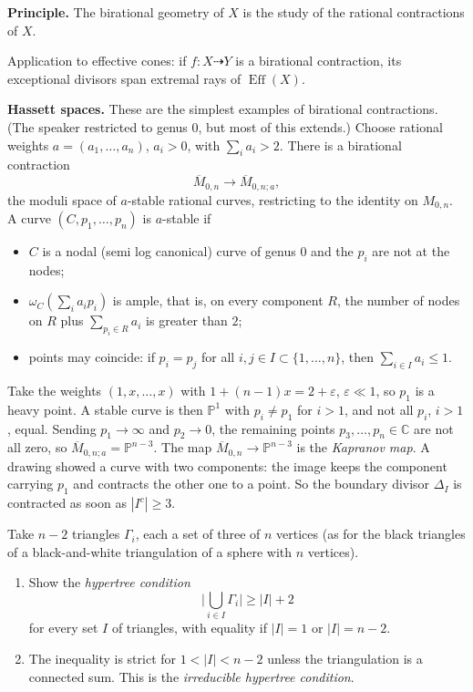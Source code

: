 \medskip\noindent
{\bf Principle.} The birational geometry of
$X$ is the study of the rational
contractions of $X$.

Application to effective cones: if
$f\colon X\dashrightarrow Y$ is a birational
contraction, its exceptional divisors span
extremal rays of $\operatorname{Eff}(X)$.

\medskip\noindent
{\bf Hassett spaces.} These are the simplest
examples of birational contractions. (The
speaker restricted to genus $0$, but most of
this extends.) Choose rational weights
$a=(a_1,\ldots,a_n)$, $a_i>0$, with
$\sum_i a_i>2$. There is a birational
contraction
$$
\overline{M}_{0,n}\longrightarrow
\overline{M}_{0,n;a},
$$
the moduli space of $a$-stable rational
curves, restricting to the identity on
$M_{0,n}$. A curve $(C,p_1,\ldots,p_n)$ is
$a$-stable if
\begin{itemize}
\item $C$ is a nodal (semi log canonical)
curve of genus $0$ and the $p_i$ are not at
the nodes;
\item $\omega_C(\sum_i a_ip_i)$ is ample,
that is, on every component $R$, the number
of nodes on $R$ plus $\sum_{p_i\in R}a_i$ is
greater than $2$;
\item points may coincide: if $p_i=p_j$ for
all $i,j\in I\subset\{1,\ldots,n\}$, then
$\sum_{i\in I}a_i\leq 1$.
\end{itemize}

\begin{example}
\label{example-tevelev-kapranov}
Take the weights $(1,x,\ldots,x)$ with
$1+(n-1)x=2+\varepsilon$, $\varepsilon\ll 1$,
so $p_1$ is a heavy point. A stable curve is
then $\mathbb{P}^1$ with $p_i\neq p_1$ for
$i>1$, and not all $p_i$, $i>1$, equal.
Sending $p_1\to\infty$ and $p_2\to 0$, the
remaining points $p_3,\ldots,p_n\in
\mathbb{C}$ are not all zero, so
$\overline{M}_{0,n;a}=\mathbb{P}^{n-3}$. The
map $\overline{M}_{0,n}\to\mathbb{P}^{n-3}$
is the \emph{Kapranov map}. A drawing showed
a curve with two components: the image keeps
the component carrying $p_1$ and contracts
the other one to a point. So the boundary
divisor $\Delta_I$ is contracted as soon as
$|I^c|\geq 3$.
\end{example}

\begin{exercise}
\label{exercise-tevelev-hypertree}
Take $n-2$ triangles $\Gamma_i$, each a set
of three of $n$ vertices (as for the black
triangles of a black-and-white triangulation
of a sphere with $n$ vertices).
\begin{enumerate}
\item Show the \emph{hypertree condition}
$$
\Big|\bigcup_{i\in I}\Gamma_i\Big|
\geq |I|+2
$$
for every set $I$ of triangles, with
equality if $|I|=1$ or $|I|=n-2$.
\item The inequality is strict for
$1<|I|<n-2$ unless the triangulation is a
connected sum. This is the
\emph{irreducible hypertree condition}.
\end{enumerate}
\end{exercise}

